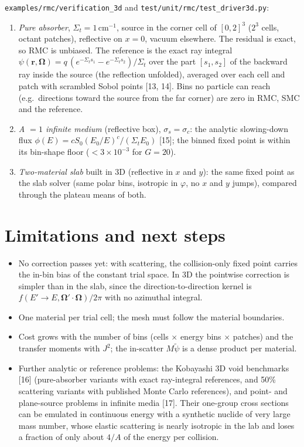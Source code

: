 \documentclass[11pt]{article}
\newcommand{\tpsi}{\tilde\psi}
\newcommand{\Sigt}{\Sigma_t}
\newcommand{\Om}{\boldsymbol\Omega}
\begin{document}
\texttt{examples/rmc/verification\_3d} and \texttt{test/unit/rmc/test\_driver3d.py}:
\begin{enumerate}
  \item \emph{Pure absorber}, $\Sigt=1$\,cm$^{-1}$, source in the corner cell of
  $[0,2]^3$ ($2^3$ cells, octant patches), reflective on $x=0$, vacuum elsewhere. The
  residual is exact, so RMC is unbiased. The reference is the exact ray integral
  $\psi(\mathbf r,\Om) = q\,(e^{-\Sigt s_1}-e^{-\Sigt s_2})/\Sigt$ over the part
  $[s_1,s_2]$ of the backward ray inside the source (the reflection unfolded),
  averaged over each cell and patch with scrambled Sobol points [13, 14]. Bins no
  particle can reach (e.g.\ directions toward the source from the far corner) are
  zero in RMC, SMC and the reference.
  \item \emph{A $=1$ infinite medium} (reflective box), $\sigma_s=\sigma_c$: the
  analytic slowing-down flux $\phi(E)=cS_0(E_0/E)^c/(\Sigt E_0)$ [15]; the
  binned fixed point is within its bin-shape floor ($<3\times10^{-3}$ for $G=20$).
  \item \emph{Two-material slab} built in 3D (reflective in $x$ and $y$): the same
  fixed point as the slab solver (same polar bins, isotropic in $\varphi$, no $x$
  and $y$ jumps), compared through the plateau means of both.
\end{enumerate}

\section{Limitations and next steps}

\begin{itemize}
  \item No correction passes yet: with scattering, the collision-only fixed point
  carries the in-bin bias of the constant trial space. In 3D the pointwise
  correction is simpler than in the slab, since the direction-to-direction kernel is
  $f(E'\!\to E,\Om'\cdot\Om)/2\pi$ with no azimuthal integral.
  \item One material per trial cell; the mesh must follow the material boundaries.
  \item Cost grows with the number of bins (cells $\times$ energy bins $\times$
  patches) and the transfer moments with $J^2$; the in-scatter $M\tpsi$ is a dense
  product per material.
  \item Further analytic or reference problems: the Kobayashi 3D void benchmarks
  [16] (pure-absorber variants with exact ray-integral references, and 50\%
  scattering variants with published Monte Carlo references), and point- and
  plane-source problems in infinite media [17]. Their one-group cross sections can be
  emulated in continuous energy with a synthetic nuclide of very large mass number,
  whose elastic scattering is nearly isotropic in the lab and loses a fraction of
  only about $4/A$ of the energy per collision.
\end{itemize}
\end{document}
